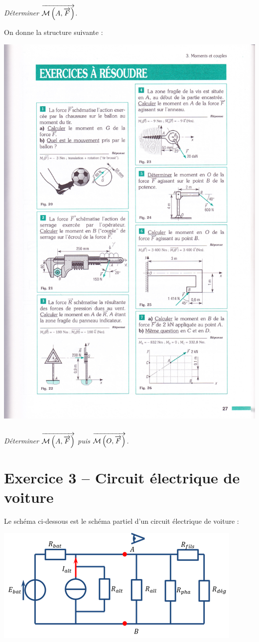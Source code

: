 \documentclass[10pt,fleqn]{book} %
\begin{document}
\begin{multicols}{2}
\subparagraph{}
\textit{Déterminer $\overrightarrow{\mathcal{M}\left(A,\overrightarrow{F} \right)}$.}

On donne la structure suivante : 
\begin{center}
\includegraphics[width=.6\linewidth]{images/fig_03}
\end{center}


\subparagraph{}
\textit{Déterminer $\overrightarrow{\mathcal{M}\left(A,\overrightarrow{F} \right)}$ puis $\overrightarrow{\mathcal{M}\left(O,\overrightarrow{F} \right)}$.}




\section*{Exercice 3 -- Circuit électrique de voiture}
\setcounter{subparagraph}{0}
Le schéma ci-dessous est le schéma partiel d'un circuit électrique de voiture :
\begin{center}
\includegraphics[width=.8\linewidth]{images/fig_04}
\end{center}


\end{multicols}
\end{document}
